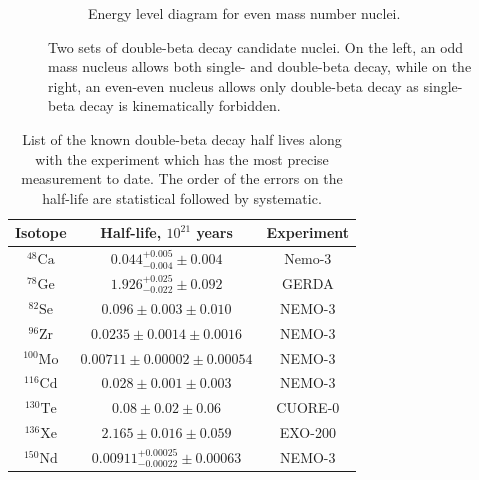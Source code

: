 \begin{figure}[htbp]
\begin{subfigure}[t]{0.45\textwidth}
\caption[[Energy level diagram for even mass number nuclei.]{Energy level diagram for even mass number nuclei.}
\end{subfigure}
\caption[Two sets of double-beta decay candidate nuclei. On the left, an odd mass nucleus allows both single- and double-beta decay, while on the right, an even-even nucleus allows only double-beta decay as single-beta decay is kinematically forbidden.]{Two sets of double-beta decay candidate nuclei. On the left, an odd mass nucleus allows both single- and double-beta decay, while on the right, an even-even nucleus allows only double-beta decay as single-beta decay is kinematically forbidden.}
\label{fig:parabola_even}
\end{figure}

\begin{table}[htpb]
\centering
\begin{tabular}{|c|c|c|}
\hline
Isotope & Half-life, $10^{21}$ years & Experiment \\ \hline 
$^{48}\textrm{Ca}$ & $0.044^{+0.005}_{-0.004} \pm 0.004$ & Nemo-3 \cite{Bongrand:2011ei} \\ \hline
$^{78}\textrm{Ge}$ & $1.926^{+0.025}_{-0.022} \pm 0.092$ & GERDA \cite{Agostini:2015nwa} \\ \hline
$^{82}\textrm{Se}$ & $0.096 \pm 0.003 \pm 0.010$ & NEMO-3 \cite{Bongrand:2011ei}\\ \hline
$^{96}\textrm{Zr}$ & $0.0235 \pm 0.0014 \pm 0.0016$ & NEMO-3 \cite{Bongrand:2011ei}\\ \hline
$^{100}\textrm{Mo}$ & $0.00711 \pm 0.00002 \pm 0.00054$ & NEMO-3 \cite{Bongrand:2011ei}\\ \hline
$^{116}\textrm{Cd}$ & $0.028 \pm 0.001 \pm 0.003$ & NEMO-3 \cite{Bongrand:2011ei} \\ \hline
$^{130}\textrm{Te}$ & $0.08 \pm 0.02\pm 0.06$ & CUORE-0 \cite{Alduino:2016vtd} \\ \hline
$^{136}\textrm{Xe}$ & $2.165 \pm 0.016 \pm 0.059$ & EXO-200 \cite{Albert:2013gpz} \\ \hline
$^{150}\textrm{Nd}$ & $0.00911^{+0.00025}_{-0.00022}\pm 0.00063$ & NEMO-3 \cite{Bongrand:2011ei} \\ \hline
\end{tabular} 
\caption[List of known two-neutrino beta decay half lives.]{List of the known double-beta decay half lives along with the experiment which has the most precise measurement to date. The order of the errors on the half-life are statistical followed by systematic.}
\label{tab:2nuHalfLife}

\end{table}

